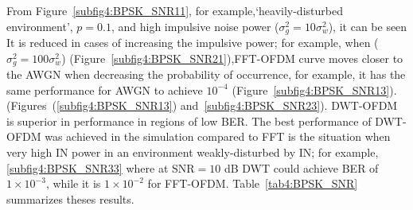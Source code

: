 			 From Figure~\ref{subfig4:BPSK_SNR11}, for example,`heavily-disturbed environment', $ p=0.1 $, and high impulsive noise power ($\sigma_g^2=10\sigma_w^2$), it can be seen  It is reduced in cases of increasing the impulsive power; for example, when ($\sigma_g^2=100\sigma_w^2$) (Figure~\ref{subfig4:BPSK_SNR21}),FFT-OFDM curve moves closer to the AWGN when decreasing the probability of occurrence, for example, it has the same performance for AWGN to achieve  $ 10^{-4} $ (Figure~\ref{subfig4:BPSK_SNR13}).  (Figures~(\ref{subfig4:BPSK_SNR13}) and~\ref{subfig4:BPSK_SNR23}).
			 DWT-OFDM is superior in performance in regions of low BER. The best performance of DWT-OFDM was achieved in the simulation compared to FFT is the situation when very high IN power in an environment weakly-disturbed by IN; for example, \ref{subfig4:BPSK_SNR33} where at SNR$ =10 $ dB DWT could achieve BER of $ 1 \times 10^{-3} $, while it is $ 1 \times 10^{-2} $ for FFT-OFDM.
			Table~\ref{tab4:BPSK_SNR} summarizes theses results.
